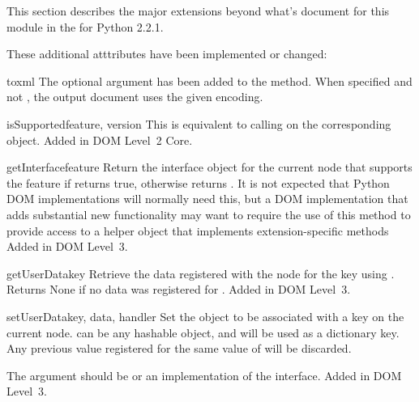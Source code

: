 \documentclass{howto}
\begin{document}
This section describes the major extensions beyond what's document for
this module in the  for Python 2.2.1.

These additional  atttributes have been implemented or
changed:

\begin{methoddesc}[Node]{toxml}{}
  The optional  argument has been added to the
   method.  When specified and not , the
  output document uses the given encoding.
\end{methoddesc}

\begin{methoddesc}[Node]{isSupported}{feature, version}
  This is equivalent to calling  on the corresponding 
  object.  Added in DOM Level~2 Core.
\end{methoddesc}

\begin{methoddesc}[Node]{getInterface}{feature}
  Return the interface object for the current node that supports the
   feature if 
  returns true, otherwise returns .  It is not expected
  that Python DOM implementations will normally need this, but a DOM
  implementation that adds substantial new functionality may want to
  require the use of this method to provide access to a helper object
  that implements extension-specific methods
  Added in DOM Level~3.
\end{methoddesc}

\begin{methoddesc}[Node]{getUserData}{key}
  Retrieve the data registered with the node for the key 
  using .  Returns None if no data was
  registered for .
  Added in DOM Level~3.
\end{methoddesc}

\begin{methoddesc}[Node]{setUserData}{key, data, handler}
  Set the object  to be associated with a key  on
  the current node.   can be any hashable object, and will be
  used as a dictionary key.  Any previous value registered for the
  same value of  will be discarded.

  The  argument should be  or an
  implementation of the  interface.
  Added in DOM Level~3.
\end{methoddesc}
\end{document}
